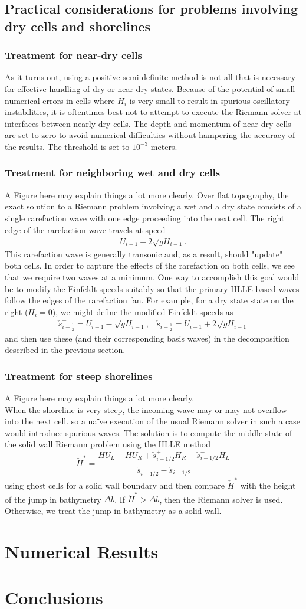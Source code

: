 \documentclass{beamer}
\begin{document}
\subsection{Practical considerations for problems involving dry cells and shorelines}
\frame
{
\frametitle{Treatment for near-dry cells}
As it turns out, using a positive semi-definite method is not all that is necessary for effective handling of dry or near dry states.  Because of the potential of small numerical errors in cells where $H_i$ is very small to result in spurious oscillatory instabilities, it is oftentimes best not to attempt to execute the Riemann solver at interfaces between nearly-dry cells. The depth and momentum of near-dry cells are set to zero to avoid numerical difficulties without hampering the accuracy of the results. The threshold is set to $10^{-3}$ meters.
}
\frame
{
\frametitle{Treatment for neighboring wet and dry cells}
A Figure here may explain things a lot more clearly.
Over flat topography, the exact solution to a Riemann problem involving a wet and a dry state consists of a single rarefaction wave with one edge proceeding into the next cell. The right edge of the rarefaction wave travels at speed
\begin{align*}
U_{i-1}+2\sqrt{g H_{i-1}}.
\end{align*}
This rarefaction wave is generally transonic and, as a result, should "update" both cells.  In order to capture the effects of the rarefaction on both cells, we see that we require two waves at a minimum.  One way to accomplish this goal would be to modify the Einfeldt speeds suitably so that the primary HLLE-based waves follow the edges of the rarefaction fan.  For example, for a dry state state on the right ($H_i=0$), we might define the modified Einfeldt speeds as
\begin{align*}
\check s_{i-\frac{1}{2}}^-=U_{i-1}-\sqrt{g H_{i-1}}, & \check s_{i-\frac{1}{2}}=U_{i-1}+2\sqrt{g H_{i-1}}
\end{align*}
and then use these (and their corresponding basis waves) in the decomposition described in the previous section.
}
\frame
{
\frametitle{Treatment for steep shorelines}
A Figure here may explain things a lot more clearly.\\
When the shoreline is very steep, the incoming wave may or may not overflow into the next cell. so a na\"ive execution of the usual Riemann solver in such a case would introduce spurious waves. The solution is to compute the middle state of the solid wall Riemann problem using the HLLE method
\begin{equation}
\check{H}^*=\frac{HU_{L}-HU_R+\check{s}_{i-1/2}^+ H_R-\check{s}_{i-1/2}^- H_L}{\check{s}_{i-1/2}^+-\check{s}_{i-1/2}^-}
\end{equation}
using ghost cells for a solid wall boundary and then compare $\check{H}^*$ with the height of the jump in bathymetry $\Delta b$. If $\check{H}^*>\Delta b$, then the Riemann solver is used. Otherwise, we treat the jump in bathymetry as a solid wall.
}

\section{Numerical Results}
\section{Conclusions}
\end{document}
